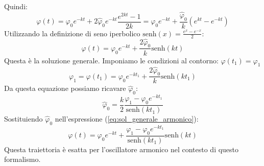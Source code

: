 Quindi:
\begin{equation}
\varphi(t)=\varphi_{0}e^{-kt}+2\hat{\varphi}_{0}e^{-kt}\frac{e^{2kt}-1}{2k} = \varphi_{0}e^{-kt}+\frac{\hat{\varphi}_{0}}{k}(e^{kt}-e^{-kt})
\end{equation}
Utilizzando la definizione di seno iperbolico $\text{senh}(x) = \frac{e^x - e^{-x}}{2}$:
\begin{equation}
\varphi(t)=\varphi_{0}e^{-kt}+\frac{2\hat{\varphi}_{0}}{k}\text{senh}(kt) \label{eq:sol_generale_armonico}
\end{equation}
Questa è la soluzione generale.
Imponiamo le condizioni al contorno: $\varphi(t_1) = \varphi_1$
\begin{equation}
\varphi_{1}=\varphi(t_{1})=\varphi_{0}e^{-kt_{1}}+\frac{2\hat{\varphi}_{0}}{k}\text{senh}(kt_{1})
\end{equation}
Da questa equazione possiamo ricavare $\hat{\varphi}_0$:
\begin{equation}
\hat{\varphi}_{0}=\frac{k}{2}\frac{\varphi_{1}-\varphi_{0}e^{-kt_{1}}}{\text{senh}(kt_{1})}
\end{equation}
Sostituiendo $\hat{\varphi}_{0}$ nell'espressione (\ref{eq:sol_generale_armonico}):
\begin{equation}
\varphi(t)=\varphi_{0}e^{-kt}+\frac{\varphi_{1}-\varphi_{0}e^{-kt_{1}}}{\text{senh}(kt_{1})}\text{senh}(kt)
\end{equation}
Questa traiettoria è esatta per l'oscillatore armonico nel contesto di questo formalismo.

